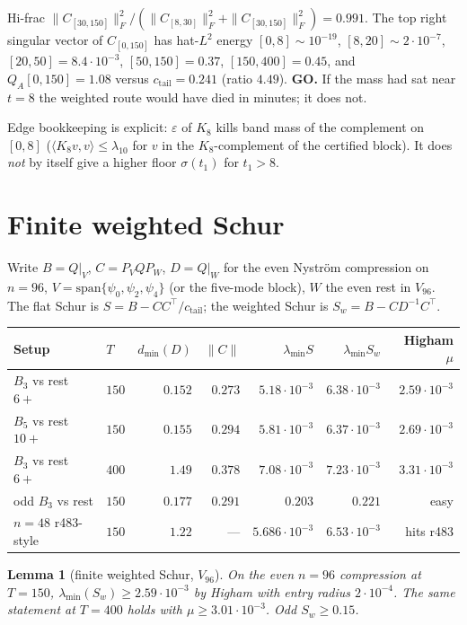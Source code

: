 \documentclass[11pt]{article}
\newtheorem{lemma}{Lemma}
\theoremstyle{remark}
\begin{document}
Hi-frac
$\|C_{[30,150]}\|_F^2\big/
(\|C_{[8,30]}\|_F^2+\|C_{[30,150]}\|_F^2)=0.991$.
The top right singular vector of $C_{[0,150]}$ has
hat-$L^2$ energy
$[0,8]\sim10^{-19}$,
$[8,20]\sim2\cdot10^{-7}$,
$[20,50]=8.4\cdot10^{-3}$,
$[50,150]=0.37$,
$[150,400]=0.45$,
and $Q_A[0,150]=1.08$ versus $c_{\mathrm{tail}}=0.241$
(ratio $4.49$).
\textbf{GO.}
If the mass had sat near $t=8$ the weighted route
would have died in minutes; it does not.

Edge bookkeeping is explicit: $\varepsilon$ of $K_8$
kills band mass of the complement on $[0,8]$
($\langle K_8 v,v\rangle\le\lambda_{10}$ for $v$ in
the $K_8$-complement of the certified block).
It does \emph{not} by itself give a higher floor
$\sigma(t_1)$ for $t_1>8$.

\section{Finite weighted Schur}

Write $B=Q|_V$, $C=P_V Q P_W$, $D=Q|_W$ for the
even Nystr\"om compression on $n=96$,
$V=\mathrm{span}\{\psi_0,\psi_2,\psi_4\}$
(or the five-mode block), $W$ the even rest in $V_{96}$.
The flat Schur is $S=B-CC^\top/c_{\mathrm{tail}}$;
the weighted Schur is $S_w=B-CD^{-1}C^\top$.

\begin{center}
\small
\begin{tabular}{@{}llrrrrr@{}}
\toprule
Setup & $T$ & $d_{\min}(D)$ & $\|C\|$
  & $\lambda_{\min}S$ & $\lambda_{\min}S_w$ & Higham $\mu$ \\
\midrule
$B_3$ vs rest $6+$ & $150$
  & $0.152$ & $0.273$
  & $5.18\cdot10^{-3}$ & $6.38\cdot10^{-3}$
  & $2.59\cdot10^{-3}$ \\
$B_5$ vs rest $10+$ & $150$
  & $0.155$ & $0.294$
  & $5.81\cdot10^{-3}$ & $6.37\cdot10^{-3}$
  & $2.69\cdot10^{-3}$ \\
$B_3$ vs rest $6+$ & $400$
  & $1.49$ & $0.378$
  & $7.08\cdot10^{-3}$ & $7.23\cdot10^{-3}$
  & $3.31\cdot10^{-3}$ \\
odd $B_3$ vs rest & $150$
  & $0.177$ & $0.291$
  & $0.203$ & $0.221$ & easy \\
$n=48$ r483-style & $150$
  & $1.22$ & ---
  & $5.686\cdot10^{-3}$ & $6.53\cdot10^{-3}$
  & hits r483 \\
\bottomrule
\end{tabular}
\end{center}

\begin{lemma}[finite weighted Schur, $V_{96}$]
On the even $n=96$ compression at $T=150$,
$\lambda_{\min}(S_w)\ge2.59\cdot10^{-3}$
by Higham with entry radius $2\cdot10^{-4}$.
The same statement at $T=400$ holds with
$\mu\ge3.01\cdot10^{-3}$.
Odd $S_w\ge0.15$.
\end{lemma}
\end{document}
